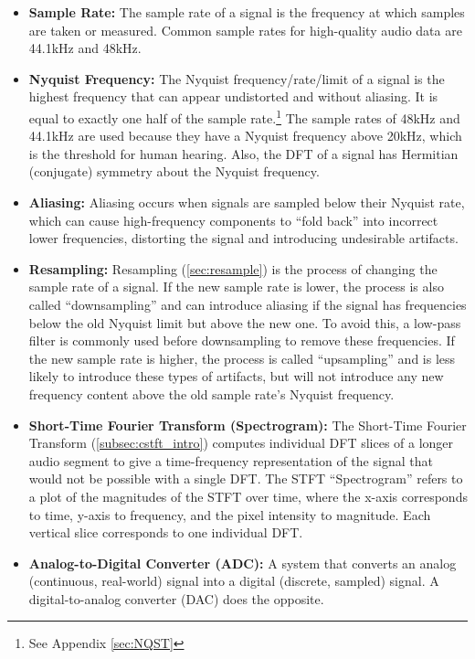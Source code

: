 \documentclass[11pt,twoside]{report}
\numberwithin{thm}{section}
\numberwithin{equation}{section}
\begin{document}
\begin{itemize}
    \item \textbf{Sample Rate: }The sample rate of a signal is the frequency at which  samples are taken or measured. Common sample rates for high-quality audio data are 44.1kHz and 48kHz. 

    \item \textbf{Nyquist Frequency: }The Nyquist frequency/rate/limit of a signal is the highest frequency that can appear undistorted and without aliasing. It is equal to exactly one half of the sample rate.\footnote{See Appendix \ref{sec:NQST}} The sample rates of 48kHz and 44.1kHz are used because they have a Nyquist frequency above 20kHz, which is the threshold for human hearing. Also, the DFT of a signal has Hermitian (conjugate) symmetry about the Nyquist frequency. 

    \item \textbf{Aliasing: }Aliasing occurs when signals are sampled below their Nyquist rate, which can cause high-frequency components to ``fold back'' into incorrect lower frequencies, distorting the signal and introducing undesirable artifacts. 

    \item \textbf{Resampling: }Resampling (\ref{sec:resample}) is the process of changing the sample rate of a signal. If the new sample rate is lower, the process is also called ``downsampling'' and can introduce aliasing if the signal has frequencies below the old Nyquist limit but above the new one. To avoid this, a low-pass filter is commonly used before downsampling to remove these frequencies. If the new sample rate is higher, the process is called ``upsampling'' and is less likely to introduce these types of artifacts, but will not introduce any new frequency content above the old sample rate's Nyquist frequency. 

    \item \textbf{Short-Time Fourier Transform (Spectrogram): }The Short-Time Fourier Transform (\ref{subsec:cstft_intro}) computes individual DFT slices of a longer audio segment to give a time-frequency representation of the signal that would not be possible with a single DFT. The STFT ``Spectrogram'' refers to a plot of the magnitudes of the STFT over time, where the x-axis corresponds to time, y-axis to frequency, and the pixel intensity to magnitude. Each vertical slice corresponds to one individual DFT. 

    \item \textbf{Analog-to-Digital Converter (ADC): }A system that converts an analog (continuous, real-world) signal into a digital (discrete, sampled) signal. A digital-to-analog converter (DAC) does the opposite.


\end{itemize}
\end{document}
